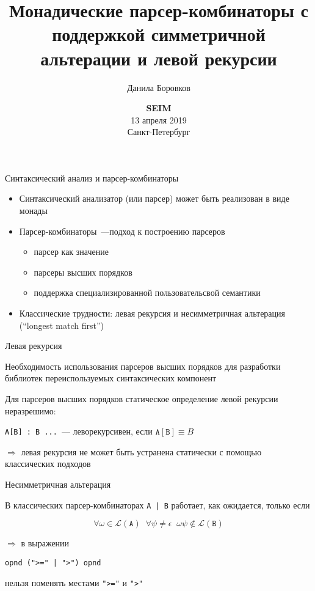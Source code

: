 \documentclass[10pt, mathserif]{beamer}
\title{Монадические парсер-комбинаторы с поддержкой симметричной альтерации и левой рекурсии}
\author{Данила Боровков}
\date{
   \vskip 3cm
   \small{
   \textbf{SEIM}\\
   13 апреля 2019 \\
   Санкт-Петербург}
}
\theoremstyle{definition}
\begin{document}
\begin{frame}
  \titlepage
\end{frame}

\begin{frame}[fragile]{Синтаксический анализ и парсер-комбинаторы}
  \begin{itemize}
    \item Синтаксический анализатор (или парсер) может быть реализован в виде монады
    \item Парсер-комбинаторы~---подход к построению парсеров
      \begin{itemize}
         \item парсер как значение
         \item парсеры высших порядков
         \item поддержка специализированной пользовательсвой семантики
      \end{itemize}
   \item Классические трудности: левая рекурсия и несимметричная альтерация (``longest match first'')
  \end{itemize}
\end{frame}

\begin{frame}[fragile]{Левая рекурсия}

  Необходимость использования парсеров высших порядков для разработки библиотек переиспользуемых
  синтаксических компонент
  \vskip3mm

  Для парсеров высших порядков статическое определение левой рекурсии неразрешимо:
  \vskip3mm

  \begin{center}
    \texttt{A[B] : B ...}~--- леворекурсивен, если $\mathtt{A[B]} \equiv B$
  \end{center}
  \vskip3mm

  $\Rightarrow$ левая рекурсия не может быть устранена статически с помощью классических подходов

\end{frame}

\begin{frame}[fragile]{Несимметричная альтерация}

  В классических парсер-комбинаторах \texttt{A | B} работает, как ожидается, только если

  \[
  \forall\omega\in{\mathscr L}(\mathtt{A})\;\;\forall\psi\not=\epsilon\;\;\omega\psi\not\in{\mathscr L}(\mathtt{B})
  \]


  $\Rightarrow$ в выражении

  \begin{center}
    \verb/opnd (">=" | ">") opnd/
  \end{center}

  нельзя поменять местами \verb/">="/ и \verb/">"/

\end{frame}
\end{document}
